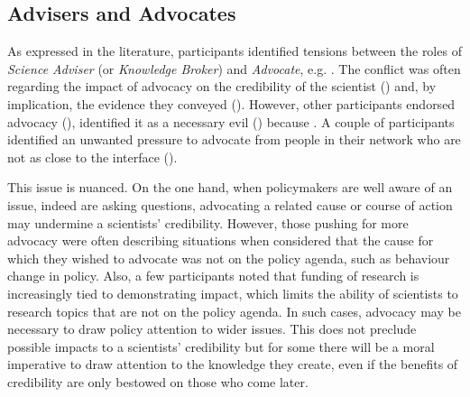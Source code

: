 \subsection{Advisers and Advocates}\label{sec:disadvocacy}

As expressed in the literature, participants identified tensions between the roles of \emph{Science Adviser} (or \emph{Knowledge Broker}) and \emph{Advocate}, e.g. . The conflict was often regarding the impact of advocacy on the credibility of the scientist () 
and, by implication, the evidence they conveyed (). However, other participants endorsed advocacy (), identified it as a necessary evil () because . A couple of participants identified an unwanted pressure to advocate from people in their network who are not as close to the interface ().

This issue is nuanced. On the one hand, when policymakers are well aware of an issue, indeed are asking questions, advocating a related cause or course of action may undermine a scientists' credibility. However, those pushing for more advocacy were often describing situations when considered that the cause for which they wished to advocate was not on the policy agenda, such as behaviour change in \CAN{} policy. Also, a few participants noted that funding of research is increasingly tied to demonstrating impact, which limits the ability of scientists to research topics that are not on the policy agenda. In such cases, advocacy may be necessary to draw policy attention to wider issues. This does not preclude possible impacts to a scientists' credibility but for some there will be a moral imperative to draw attention to the knowledge they create, even if the benefits of credibility are only bestowed on those who come later. 

